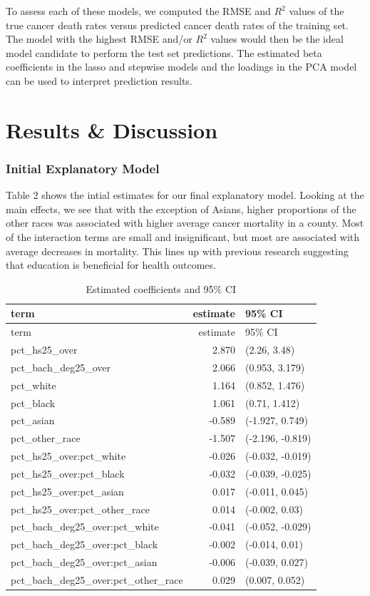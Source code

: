 \documentclass[
  11pt,
]{article}
\begin{document}
To assess each of these models, we computed the RMSE and \(R^2\) values
of the true cancer death rates versus predicted cancer death rates of
the training set. The model with the highest RMSE and/or \(R^2\) values
would then be the ideal model candidate to perform the test set
predictions. The estimated beta coefficients in the lasso and stepwise
models and the loadings in the PCA model can be used to interpret
prediction results.

\hypertarget{results-discussion}{%
\section{Results \& Discussion}\label{results-discussion}}

\hypertarget{initial-explanatory-model}{%
\subsubsection{Initial Explanatory
Model}\label{initial-explanatory-model}}

Table 2 shows the intial estimates for our final explanatory model.
Looking at the main effects, we see that with the exception of Asians,
higher proportions of the other races was associated with higher average
cancer mortality in a county. Most of the interaction terms are small
and insignificant, but most are associated with average decreases in
mortality. This lines up with previous research suggesting that
education is beneficial for health outcomes.

\begin{longtable}[]{@{}lrl@{}}
\caption{Estimated coefficients and 95\% CI}\tabularnewline
\toprule
term & estimate & 95\% CI\tabularnewline
\midrule
\endfirsthead
\toprule
term & estimate & 95\% CI\tabularnewline
\midrule
\endhead
pct\_hs25\_over & 2.870 & (2.26, 3.48)\tabularnewline
pct\_bach\_deg25\_over & 2.066 & (0.953, 3.179)\tabularnewline
pct\_white & 1.164 & (0.852, 1.476)\tabularnewline
pct\_black & 1.061 & (0.71, 1.412)\tabularnewline
pct\_asian & -0.589 & (-1.927, 0.749)\tabularnewline
pct\_other\_race & -1.507 & (-2.196, -0.819)\tabularnewline
pct\_hs25\_over:pct\_white & -0.026 & (-0.032, -0.019)\tabularnewline
pct\_hs25\_over:pct\_black & -0.032 & (-0.039, -0.025)\tabularnewline
pct\_hs25\_over:pct\_asian & 0.017 & (-0.011, 0.045)\tabularnewline
pct\_hs25\_over:pct\_other\_race & 0.014 & (-0.002, 0.03)\tabularnewline
pct\_bach\_deg25\_over:pct\_white & -0.041 & (-0.052,
-0.029)\tabularnewline
pct\_bach\_deg25\_over:pct\_black & -0.002 & (-0.014,
0.01)\tabularnewline
pct\_bach\_deg25\_over:pct\_asian & -0.006 & (-0.039,
0.027)\tabularnewline
pct\_bach\_deg25\_over:pct\_other\_race & 0.029 & (0.007,
0.052)\tabularnewline
\bottomrule
\end{longtable}
\end{document}

